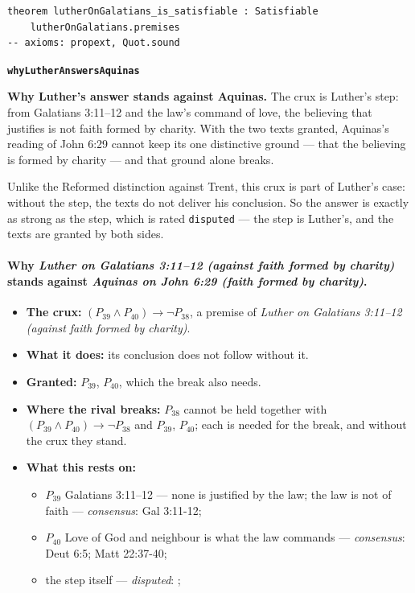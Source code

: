 \documentclass[11pt]{article}
\begin{document}
{\small\begin{verbatim}
theorem lutherOnGalatians_is_satisfiable : Satisfiable
    lutherOnGalatians.premises
-- axioms: propext, Quot.sound
\end{verbatim}}
\par\medskip\noindent\textbf{\texttt{why\allowbreak{}Luther\allowbreak{}Answers\allowbreak{}Aquinas}}\par\nobreak\noindent
\textbf{Why Luther's answer stands against Aquinas.} The crux is Luther's step: from Galatians 3:11–12 and the law's command of love, the believing that justifies is not faith formed by charity. With the two texts granted, Aquinas's reading of John 6:29 cannot keep its one distinctive ground — that the believing is formed by charity — and that ground alone breaks.

Unlike the Reformed distinction against Trent, this crux is part of Luther's case: without the step, the texts do not deliver his conclusion. So the answer is exactly as strong as the step, which is rated \texttt{disputed} — the step is Luther's, and the texts are granted by both sides.

\paragraph{Why \emph{Luther on Galatians 3:11–12 (against faith formed by charity)} stands against \emph{Aquinas on John 6:29 (faith formed by charity)}.}
\begin{itemize}
\item \textbf{The crux:} \((P_{39} \land P_{40}) \rightarrow \lnot P_{38}\), a premise of \emph{Luther on Galatians 3:11–12 (against faith formed by charity)}.
\item \textbf{What it does:} its conclusion does not follow without it.
\item \textbf{Granted:} \(P_{39}\), \(P_{40}\), which the break also needs.
\item \textbf{Where the rival breaks:} \(P_{38}\) cannot be held together with \((P_{39} \land P_{40}) \rightarrow \lnot P_{38}\) and \(P_{39}\), \(P_{40}\); each is needed for the break, and without the crux they stand.
\item \textbf{What this rests on:}
\begin{itemize}
\item \(P_{39}\) Galatians 3:11–12 — none is justified by the law; the law is not of faith --- \emph{consensus}: Gal 3:11-12; \cite[ad loc. Gal 3:11]{luther-commentary-galatians-1998}
\item \(P_{40}\) Love of God and neighbour is what the law commands --- \emph{consensus}: Deut 6:5; Matt 22:37-40; \cite[ad loc. Gal 3:12]{luther-commentary-galatians-1998}
\item the step itself --- \emph{disputed}: \cite[ad loc. Gal 3:12]{luther-commentary-galatians-1998}; \cite[ad loc. Gal 3:11]{luther-commentary-galatians-1998}
\end{itemize}
\end{itemize}
\end{document}
